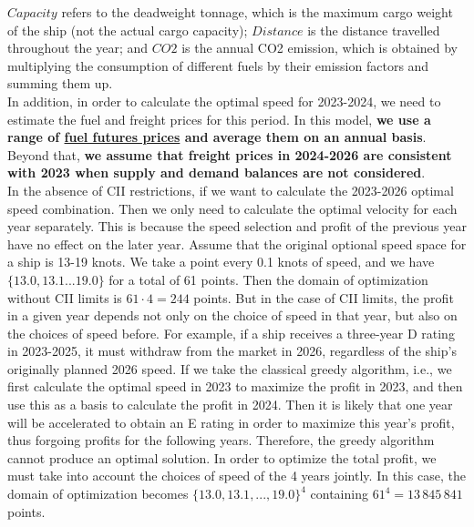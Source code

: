 \documentclass[a4paper,12pt]{article}
\begin{document}
$Capacity$ refers to the deadweight tonnage, which is the maximum cargo weight of the ship (not the actual cargo capacity);
$Distance$ is the distance travelled throughout the year;
and $CO2$ is the annual CO2 emission, which is obtained by multiplying the consumption of different fuels by their emission factors and summing them up.\\

In addition, in order to calculate the optimal speed for 2023-2024, we need to estimate the fuel and freight prices for this period.
In this model, \textbf{we use a range of \href{https://www.cmegroup.com/markets/energy/refined-products/singapore-380cst-fuel-oil-platts-swap-futures.html}{fuel futures prices} and average them on an annual basis}.
Beyond that, \textbf{we assume that freight prices in 2024-2026 are consistent with 2023 when supply and demand balances are not considered}.\\


In the absence of CII restrictions, if we want to calculate the 2023-2026 optimal speed combination.
Then we only need to calculate the optimal velocity for each year separately.
This is because the speed selection and profit of the previous year have no effect on the later year.
Assume that the original optional speed space for a ship is 13-19 knots.
We take a point every 0.1 knots of speed, and we have $\{13.0, 13.1 ... 19.0\}$ for a total of 61 points.
Then the domain of optimization without CII limits is $61 \cdot 4 = 244$ points.
But in the case of CII limits, the profit in a given year depends not only on the choice of speed in that year, but also on the choices of speed before.
For example, if a ship receives a three-year D rating in 2023-2025, it must withdraw from the market in 2026, regardless of the ship's originally planned 2026 speed.
If we take the classical greedy algorithm, i.e., we first calculate the optimal speed in 2023 to maximize the profit in 2023, and then use this as a basis to calculate the profit in 2024.
Then it is likely that one year will be accelerated to obtain an E rating in order to maximize this year's profit, thus forgoing profits for the following years.
Therefore, the greedy algorithm cannot produce an optimal solution.
In order to optimize the total profit, we must take into account the choices of speed of the 4 years jointly.
In this case, the domain of optimization becomes $\{13.0, 13.1, ..., 19.0\}^4$ containing $61^4 = 13 \,845 \,841$ points.\\
\end{document}
